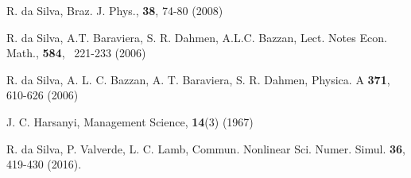 \documentclass[3p, 11pt]{elsarticle}
\begin{document}
\begin{thebibliography}{99}
 R. da Silva, Braz. J. Phys., \textbf{38}, 74-80 (2008)

 R. da Silva, A.T. Baraviera, S. R. Dahmen, A.L.C.
Bazzan, Lect. Notes Econ. Math., \textbf{584}, \ 221-233 (2006)

 R. da Silva, A. L. C. Bazzan, A. T. Baraviera, S.
R. Dahmen, Physica. A \textbf{371}, 610-626 (2006)

 J. C. Harsanyi, Management Science, \textbf{14}(3) (1967)

 R. da Silva, P. Valverde, L. C. Lamb, Commun.
Nonlinear Sci. Numer. Simul. \textbf{36}, 419-430 (2016).
\end{thebibliography}

\bigskip

\bigskip
\end{document}
